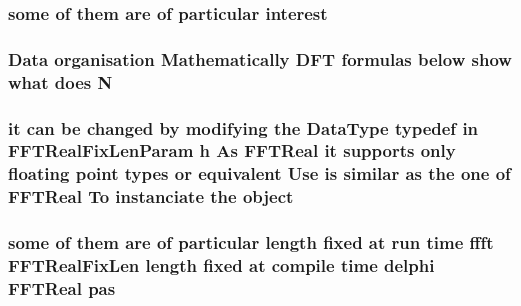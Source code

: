 \subsubsection[{\texorpdfstring{interest}{interest}}]{\setlength{\rightskip}{0pt plus 5cm}some of them are of particular interest}\hypertarget{FFTReal__readme_8txt_a8dd124b3ee508be769f386edc2b8ccc7}{}\label{FFTReal__readme_8txt_a8dd124b3ee508be769f386edc2b8ccc7}
\subsubsection[{\texorpdfstring{N}{N}}]{\setlength{\rightskip}{0pt plus 5cm}Data organisation Mathematically D\+FT formulas {\bf below} show what does N}\hypertarget{FFTReal__readme_8txt_a049dd452c22185832440207517cffdaa}{}\label{FFTReal__readme_8txt_a049dd452c22185832440207517cffdaa}
\subsubsection[{\texorpdfstring{object}{object}}]{\setlength{\rightskip}{0pt plus 5cm}it can be changed by modifying the Data\+Type typedef in F\+F\+T\+Real\+Fix\+Len\+Param {\bf h} As {\bf F\+F\+T\+Real} it supports only floating point types or equivalent Use is similar as the one of {\bf F\+F\+T\+Real} To instanciate the object}\hypertarget{FFTReal__readme_8txt_a5057f8d0a8b36ba2bdea206a5592c87a}{}\label{FFTReal__readme_8txt_a5057f8d0a8b36ba2bdea206a5592c87a}
\subsubsection[{\texorpdfstring{pas}{pas}}]{\setlength{\rightskip}{0pt plus 5cm}some of them are of particular length fixed at run time ffft F\+F\+T\+Real\+Fix\+Len length fixed at compile time delphi {\bf F\+F\+T\+Real} pas}\hypertarget{FFTReal__readme_8txt_a6cf8b214cfb6bfb689594a776ceb1ea0}{}\label{FFTReal__readme_8txt_a6cf8b214cfb6bfb689594a776ceb1ea0}
